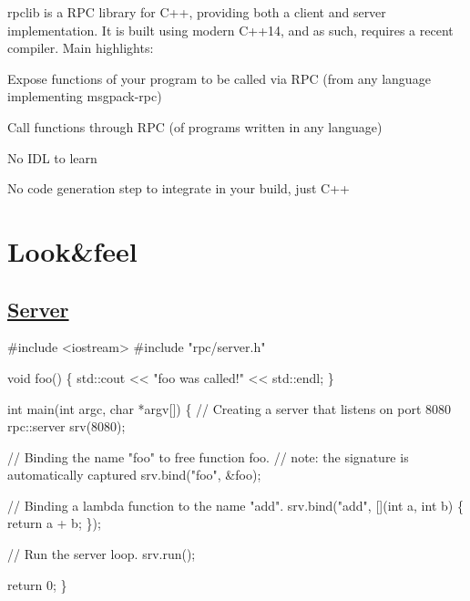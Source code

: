 \href{https://waffle.io/rpclib/rpclib}{\tt }

{\ttfamily rpclib} is a R\+PC library for C++, providing both a client and server implementation. It is built using modern C++14, and as such, requires a recent compiler. Main highlights\+:


\begin{DoxyItemize}
\item Expose functions of your program to be called via R\+PC (from any language implementing msgpack-\/rpc)
\item Call functions through R\+PC (of programs written in any language)
\item No I\+DL to learn
\item No code generation step to integrate in your build, just C++
\end{DoxyItemize}

\section*{Look\&feel}

\subsection*{\hyperlink{classServer}{Server}}


\begin{DoxyCode}
\textcolor{preprocessor}{#include <iostream>}
\textcolor{preprocessor}{#include "rpc/server.h"}

\textcolor{keywordtype}{void} foo() \{
    std::cout << \textcolor{stringliteral}{"foo was called!"} << std::endl;
\}

\textcolor{keywordtype}{int} main(\textcolor{keywordtype}{int} argc, \textcolor{keywordtype}{char} *argv[]) \{
    \textcolor{comment}{// Creating a server that listens on port 8080}
    rpc::server srv(8080);

    \textcolor{comment}{// Binding the name "foo" to free function foo.}
    \textcolor{comment}{// note: the signature is automatically captured}
    srv.bind(\textcolor{stringliteral}{"foo"}, &foo);

    \textcolor{comment}{// Binding a lambda function to the name "add".}
    srv.bind(\textcolor{stringliteral}{"add"}, [](\textcolor{keywordtype}{int} a, \textcolor{keywordtype}{int} b) \{
        \textcolor{keywordflow}{return} a + b;
    \});

    \textcolor{comment}{// Run the server loop.}
    srv.run();

    \textcolor{keywordflow}{return} 0;
\}
\end{DoxyCode}


